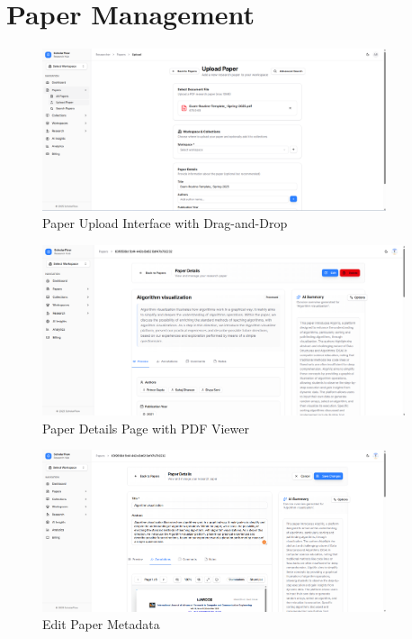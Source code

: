 \section{Paper Management}
\label{sec:screenshots-papers}

\begin{figure}[H]
\centering
\includegraphics[width=0.9\textwidth]{images/screenshots/paper_upload.png}
\caption{Paper Upload Interface with Drag-and-Drop}
\label{fig:screenshot-paper-upload}
\end{figure}

\begin{figure}[H]
\centering
\includegraphics[width=0.95\textwidth]{images/screenshots/paper_details_1.png}
\caption{Paper Details Page with PDF Viewer}
\label{fig:screenshot-paper-details}
\end{figure}

\begin{figure}[H]
\centering
\includegraphics[width=0.9\textwidth]{images/screenshots/edit_paper.png}
\caption{Edit Paper Metadata}
\label{fig:screenshot-edit-paper}
\end{figure}

